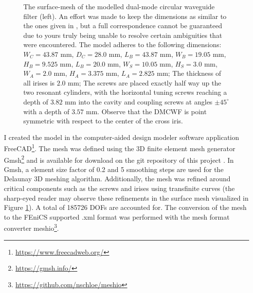 \documentclass[11pt, a4paper]{article}
\begin{document}
\begin{figure}[h]
    \centering
    
    \caption{The surface-mesh of the modelled dual-mode circular waveguide filter
    (left). An effort was made to keep the dimensions as similar to the ones
    given in \cite{DMCWF-Dimensions}, but a full correspondence cannot be guaranteed
    due to yours truly being unable to resolve certain ambiguities that were encountered.
    The model adheres to the following dimensions:
    $W_C=43.87$ mm, $D_C=28.0$ mm, $L_B=43.87$ mm, $W_B=19.05$ mm, $H_B=9.525$ mm,
    $L_B=20.0$ mm, $W_S=10.05$ mm, $H_S=3.0$ mm, $W_A=2.0$ mm, $H_A=3.375$ mm,
    $L_A=2.825$ mm; The thickness of all irises is $2.0$ mm; The screws
    are placed exactly half way up the two resonant cylinders,
    with the horizontal tuning screws reaching a depth of $3.82$ mm into the cavity
    and coupling screws at angles $\pm 45^{\circ}$ with a depth of $3.57$ mm.
    Observe that the \acrshort{DMCWF} is point symmetric with respect to the center 
    of the cross iris.}
    \label{fig:DMCWF}
\end{figure}

I created the model in the computer-aided design modeler software application
FreeCAD\footnote{\url{https://www.freecadweb.org/}}. The mesh was defined using 
the 3D finite element mesh generator Gmsh\footnote{\url{https://gmsh.info/}} and 
is available for download on the git repository 
of this project \cite{git}. In Gmsh, a element size factor of 0.2 and 5 smoothing steps
are used for the Delaunay 3D meshing algorithm. Additionally, 
the mesh was refined around critical components such as the screws and irises
using transfinite curves (the sharp-eyed reader may observe these refinements
in the surface mesh visualized in Figure \ref{fig:DMCWF}). A total of
185726 \acrshort{DOF}s are accounted for. The conversion of the
mesh to the FEniCS supported .xml format was performed with the mesh format converter
meshio\footnote{\url{https://github.com/nschloe/meshio}}. 
\end{document}
